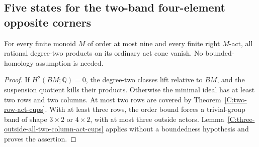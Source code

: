 \subsection{Five states for the two-band four-element opposite corners}

\begin{lemma}
\label{C:nine-unbounded-act-cups}
For every finite monoid $M$ of order at most nine and every
finite right $M$-act, all rational degree-two products on its
ordinary act cone vanish. No bounded-homology assumption is
needed.
\end{lemma}
\begin{proof}
If $H^2(BM;\mathbb Q)=0$, the degree-two classes lift relative
to $BM$, and the suspension quotient kills their products.
Otherwise the minimal ideal has at least two rows and two
columns. At most two rows are covered by
Theorem~\ref{C:two-row-act-cups}. With at least three rows,
the order bound forces a trivial-group band of shape
$3\times2$ or $4\times2$, with at most three outside actors.
Lemma~\ref{C:three-outside-all-two-column-act-cups} applies
without a boundedness hypothesis and proves the assertion.
\end{proof}

